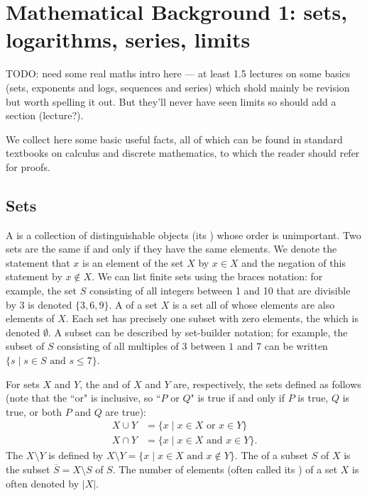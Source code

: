 \chapter{Mathematical Background 1: sets, logarithms, series, limits}
\label{ch:app:mathtools}

{\color{red} TODO: need some real maths intro here --- at least 1.5 lectures on some basics (sets, exponents and logs, sequences and series) which shold mainly be revision but worth spelling it out.  But they'll never have seen limits so should add a section (lecture?).}

 
We collect here some basic useful facts, all of which can be found in 
standard textbooks 
on calculus and discrete mathematics, to which the reader should refer for proofs.

\section{Sets}
\label{sec:app:sets}

A  is a collection of distinguishable objects  
(its ) whose order is 
unimportant. Two sets are the same if and only if they have the same elements.
We denote the statement that $x$ is an element of the set $X$ by $x\in X$ and the 
negation of this statement by $x\not\in X$.
We can list finite sets using the braces notation: for example, the set $S$ 
consisting 
of all integers between 1 and 10 that are divisible by 3 is denoted $\{3, 6, 9\}$. 
A  of a set $X$ is a set all of whose elements are also elements of 
$X$. Each set has precisely one subset with zero elements, the  
which is denoted $\emptyset$. A subset can be described by 
set-builder notation; 
for example, the subset of $S$ consisting of 
all multiples of $3$ between $1$ and $7$ can be written
$\{s \mid s \in S \text { and } s \leq 7\}$.

For sets $X$ and $Y$, the  and  
of $X$ and $Y$ are, respectively, the sets defined as follows
(note that the ``or" is inclusive, so ``$P$ or $Q$" is true if and only if $P$ is true, $Q$ is true, or both $P$ and $Q$ are true):
\begin{align*}
X \cup Y&= \{x \mid x \in X \text{ or } x \in Y\}\\
X \cap Y&=\{x \mid x \in X \text{ and } x \in Y\}.
\end{align*}
The  $X\setminus Y$ is defined by 
$X\setminus Y = \{x \mid x\in X \text{ and } x\not\in Y\}$.
The  of a subset $S$ of $X$ is the subset 
$\overline{S} = X\setminus S$ of $S$.  The number of elements
(often called its ) of
a set $X$ is often denoted by $|X|$.

